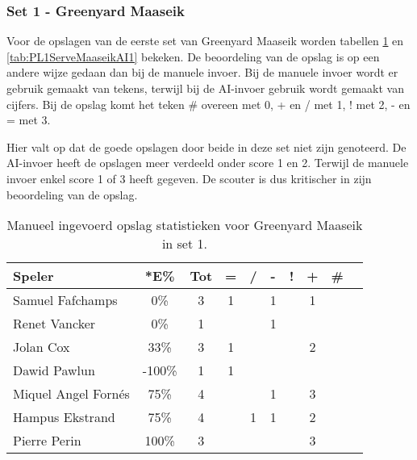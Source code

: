 \subsubsection{Set 1 - Greenyard Maaseik}
\label{sec:PL1_Greenyard1}
Voor de opslagen van de eerste set van Greenyard Maaseik worden tabellen \ref{tab:PL1ServeMaaseikMan1} en \ref{tab:PL1ServeMaaseikAI1} bekeken. De beoordeling van de opslag is op een andere wijze gedaan dan bij de manuele invoer. Bij de manuele invoer wordt er gebruik gemaakt van tekens, terwijl bij de AI-invoer gebruik wordt gemaakt van cijfers. Bij de opslag komt het teken \# overeen met 0, + en / met 1, ! met 2, - en = met 3.

Hier valt op dat de goede opslagen door beide in deze set niet zijn genoteerd. De AI-invoer heeft de opslagen meer verdeeld onder score 1 en 2. Terwijl de manuele invoer enkel score 1 of 3 heeft gegeven. De scouter is dus kritischer in zijn beoordeling van de opslag.

\begin{table}[ht!]
    \centering
    \scriptsize
    \begin{tabular}{|l|c|c|c|c|c|c|c|c|c|}
      \hline
      \textbf{Speler} & *E\% & Tot & = & / & - & ! & + & \# \\ \hline
      Samuel Fafchamps & 0\% & 3 & 1 &  & 1 &  & 1 &  \\ 
      Renet Vancker & 0\% & 1 &  &  & 1 &  &  &  \\ 
      Jolan Cox  & 33\% & 3 & 1 &  &  &  & 2 &  \\ 
      Dawid Pawlun  & -100\% & 1 & 1 &  &  &  &  &  \\ 
      Miquel Angel Fornés & 75\% & 4 &  &  & 1 &  & 3 &  \\
      Hampus Ekstrand & 75\% & 4 &  & 1 & 1 &  & 2 &  \\
      Pierre Perin & 100\% & 3 &  &  &  &  & 3 &  \\ \hline
    \end{tabular}
    \caption[Manueel ingevoerde opslagstatistieken voor Greenyard Maaseik in set 1]{\label{tab:PL1ServeMaaseikMan1}Manueel ingevoerd opslag statistieken voor Greenyard Maaseik in set 1.}
\end{table}

